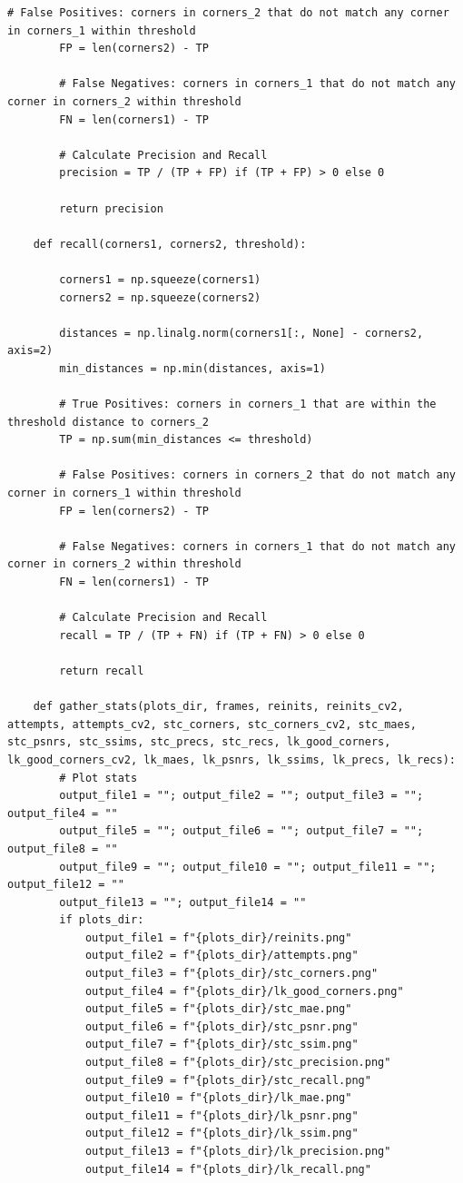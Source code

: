 \documentclass[11pt, conference, letterpaper]{IEEEtran}
\begin{document}
\begin{lstlisting}[style=python, caption={\texttt{utils.py}}, label={lst:utils}]
        # False Positives: corners in corners_2 that do not match any corner in corners_1 within threshold
        FP = len(corners2) - TP
        
        # False Negatives: corners in corners_1 that do not match any corner in corners_2 within threshold
        FN = len(corners1) - TP
        
        # Calculate Precision and Recall
        precision = TP / (TP + FP) if (TP + FP) > 0 else 0
        
        return precision
    
    def recall(corners1, corners2, threshold):
        
        corners1 = np.squeeze(corners1)
        corners2 = np.squeeze(corners2) 
        
        distances = np.linalg.norm(corners1[:, None] - corners2, axis=2)
        min_distances = np.min(distances, axis=1)
        
        # True Positives: corners in corners_1 that are within the threshold distance to corners_2
        TP = np.sum(min_distances <= threshold)
        
        # False Positives: corners in corners_2 that do not match any corner in corners_1 within threshold
        FP = len(corners2) - TP
        
        # False Negatives: corners in corners_1 that do not match any corner in corners_2 within threshold
        FN = len(corners1) - TP
        
        # Calculate Precision and Recall
        recall = TP / (TP + FN) if (TP + FN) > 0 else 0
        
        return recall
        
    def gather_stats(plots_dir, frames, reinits, reinits_cv2, attempts, attempts_cv2, stc_corners, stc_corners_cv2, stc_maes, stc_psnrs, stc_ssims, stc_precs, stc_recs, lk_good_corners, lk_good_corners_cv2, lk_maes, lk_psnrs, lk_ssims, lk_precs, lk_recs):
        # Plot stats
        output_file1 = ""; output_file2 = ""; output_file3 = ""; output_file4 = ""
        output_file5 = ""; output_file6 = ""; output_file7 = ""; output_file8 = ""
        output_file9 = ""; output_file10 = ""; output_file11 = ""; output_file12 = ""
        output_file13 = ""; output_file14 = ""
        if plots_dir:
            output_file1 = f"{plots_dir}/reinits.png"
            output_file2 = f"{plots_dir}/attempts.png"
            output_file3 = f"{plots_dir}/stc_corners.png"
            output_file4 = f"{plots_dir}/lk_good_corners.png"
            output_file5 = f"{plots_dir}/stc_mae.png"
            output_file6 = f"{plots_dir}/stc_psnr.png"
            output_file7 = f"{plots_dir}/stc_ssim.png"
            output_file8 = f"{plots_dir}/stc_precision.png"
            output_file9 = f"{plots_dir}/stc_recall.png"        
            output_file10 = f"{plots_dir}/lk_mae.png"
            output_file11 = f"{plots_dir}/lk_psnr.png"
            output_file12 = f"{plots_dir}/lk_ssim.png"
            output_file13 = f"{plots_dir}/lk_precision.png"
            output_file14 = f"{plots_dir}/lk_recall.png"
        

\end{lstlisting}
\end{document}

